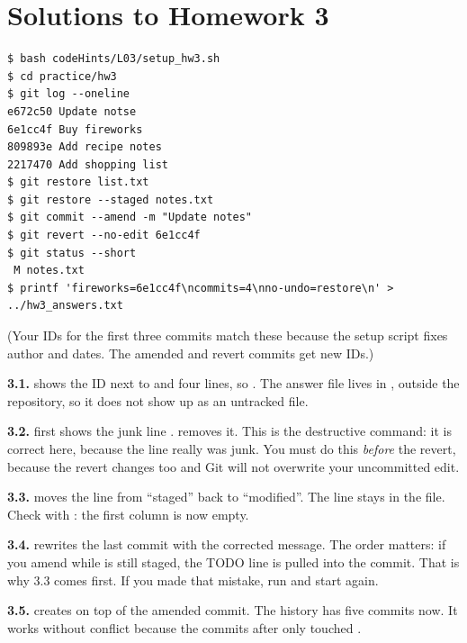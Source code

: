 \section*{Solutions to Homework 3}

\begin{lstlisting}
$ bash codeHints/L03/setup_hw3.sh
$ cd practice/hw3
$ git log --oneline
e672c50 Update notse
6e1cc4f Buy fireworks
809893e Add recipe notes
2217470 Add shopping list
$ git restore list.txt
$ git restore --staged notes.txt
$ git commit --amend -m "Update notes"
$ git revert --no-edit 6e1cc4f
$ git status --short
 M notes.txt
$ printf 'fireworks=6e1cc4f\ncommits=4\nno-undo=restore\n' > ../hw3_answers.txt
\end{lstlisting}

(Your IDs for the first three commits match these because the setup script fixes author and dates. The amended and revert commits get new IDs.)

\textbf{3.1.}  shows the ID  next to  and four lines, so . The answer file lives in , outside the repository, so it does not show up as an untracked file.

\textbf{3.2.}  first shows the junk line .  removes it. This is the destructive command: it is correct here, because the line really was junk. You must do this \emph{before} the revert, because the revert changes  too and Git will not overwrite your uncommitted edit.

\textbf{3.3.}  moves the  line from ``staged'' back to ``modified''. The line stays in the file. Check with : the first column is now empty.

\textbf{3.4.}  rewrites the last commit with the corrected message. The order matters: if you amend while  is still staged, the TODO line is pulled into the commit. That is why 3.3 comes first. If you made that mistake, run  and start again.

\textbf{3.5.}  creates  on top of the amended commit. The history has five commits now. It works without conflict because the commits after  only touched .

